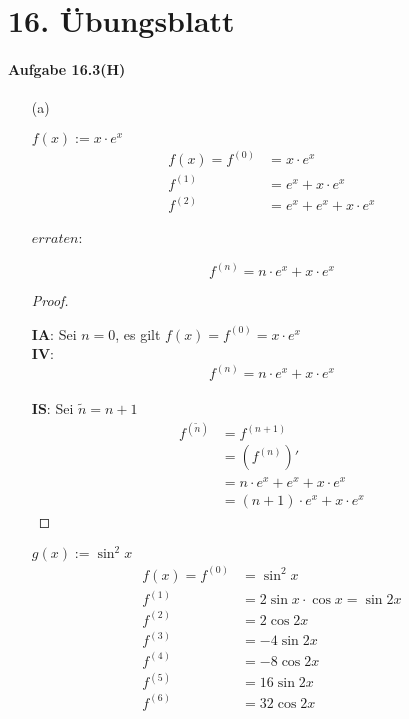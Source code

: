 \section{16. Übungsblatt}

\paragraph{Aufgabe 16.3(H)}

\begin{enumerate}

\item[(a)]

$f(x):=x\cdot e^x$
\begin{align*}
f(x)=f^{(0)}&=x\cdot e^x\\
f^{(1)}&=e^x+x\cdot e^x\\
f^{(2)}&=e^x+e^x+x\cdot e^x
\end{align*}

$erraten$:

\begin{equation}
f^{(n)}=n\cdot e^x+x\cdot e^x
\end{equation}

\begin{proof}
$ $\newline

$\mathbf{IA}$: Sei $n=0$, es gilt $f(x)=f^{(0)}=x\cdot e^x$\\

$\mathbf{IV}$:
\begin{equation}
f^{(n)}=n\cdot e^x+x\cdot e^x
\end{equation}\\

$\mathbf{IS}$: Sei $\tilde{n}=n+1$
\begin{align}
f^{(\tilde{n})}&=f^{(n+1)}\\
&=(f^{(n)})'\\
&=n\cdot e^x+e^x+x\cdot e^x\\
&=(n+1)\cdot e^x+x\cdot e^x
\end{align}
\end{proof}

$g(x):=\sin^2x$
\begin{align*}
f(x)=f^{(0)}&=\sin^2x\\
f^{(1)}&=2\sin x\cdot\cos x=\sin 2x\\
f^{(2)}&=2\cos 2x\\
f^{(3)}&=-4\sin 2x\\
f^{(4)}&=-8\cos 2x\\
f^{(5)}&=16\sin 2x\\
f^{(6)}&=32\cos 2x
\end{align*}


\end{enumerate}
